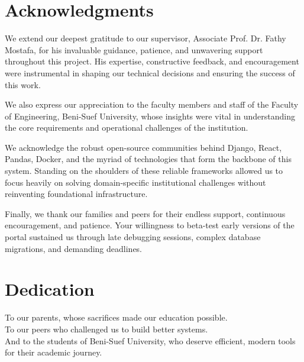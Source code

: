 \chapter*{Acknowledgments}
\label{chap:acknowledgments}

We extend our deepest gratitude to our supervisor, Associate Prof. Dr. Fathy Mostafa, for his invaluable guidance, patience, and unwavering support throughout this project. His expertise, constructive feedback, and encouragement were instrumental in shaping our technical decisions and ensuring the success of this work.

We also express our appreciation to the faculty members and staff of the Faculty of Engineering, Beni-Suef University, whose insights were vital in understanding the core requirements and operational challenges of the institution.

We acknowledge the robust open-source communities behind Django, React, Pandas, Docker, and the myriad of technologies that form the backbone of this system. Standing on the shoulders of these reliable frameworks allowed us to focus heavily on solving domain-specific institutional challenges without reinventing foundational infrastructure.

Finally, we thank our families and peers for their endless support, continuous encouragement, and patience. Your willingness to beta-test early versions of the portal sustained us through late debugging sessions, complex database migrations, and demanding deadlines.



\chapter*{Dedication}
\label{chap:dedication}

To our parents, whose sacrifices made our education possible.\\[0.5cm]
To our peers who challenged us to build better systems.\\[0.5cm]
And to the students of Beni-Suef University, who deserve efficient, modern tools for their academic journey.
